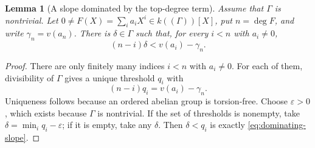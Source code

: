 \documentclass[11pt]{article}
\newcommand{\Val}{v}
\theoremstyle{proofnote}
\newtheorem{lemma}[theorem]{Lemma}
\begin{document}
\begin{lemma}[A slope dominated by the top-degree term]
\label{lem:dominating-slope}
  Assume that \(\Gamma\) is nontrivial.  Let
  \(0\ne F(X)=\sum_i a_iX^i\in k((\Gamma))[X]\), put
  \(n=\deg F\), and write \(\gamma_n=\Val(a_n)\).  There is
  \(\delta\in\Gamma\) such that, for every \(i<n\) with \(a_i\ne0\),
  \[
    (n-i)\delta<\Val(a_i)-\gamma_n.
    \tag{DS}\label{eq:dominating-slope}
  \]
\end{lemma}
\begin{proof}
  There are only finitely many indices \(i<n\) with \(a_i\ne0\).  For each
  of them, divisibility of \(\Gamma\) gives a unique threshold \(q_i\) with
  \[
    (n-i)q_i=\Val(a_i)-\gamma_n.
  \]
  Uniqueness follows because an ordered abelian group is torsion-free.
  Choose \(\varepsilon>0\), which exists because \(\Gamma\) is nontrivial.
  If the set of thresholds is nonempty, take
  \(\delta=\min_i q_i-\varepsilon\); if it is empty, take any \(\delta\).
  Then \(\delta<q_i\) is exactly
  \eqref{eq:dominating-slope}.
\end{proof}
\end{document}
